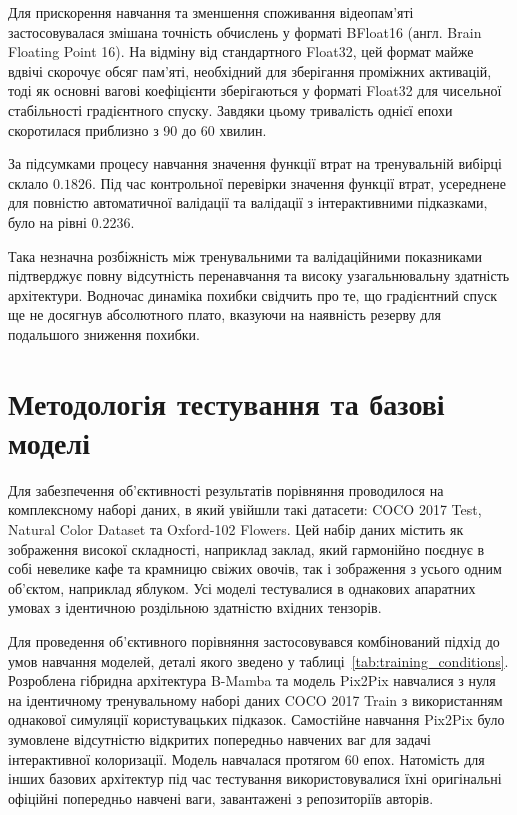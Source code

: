         Для прискорення навчання та зменшення споживання відеопам'яті застосовувалася змішана точність обчислень у форматі BFloat16 (англ. Brain Floating Point 16).
        На відміну від стандартного Float32, цей формат майже вдвічі скорочує обсяг пам'яті, необхідний для зберігання проміжних активацій, тоді як основні вагові коефіцієнти зберігаються у форматі Float32 для чисельної стабільності градієнтного спуску. Завдяки цьому тривалість однієї епохи скоротилася приблизно з 90 до 60 хвилин.

        За підсумками процесу навчання значення функції втрат на тренувальній вибірці склало $0.1826$.
        Під час контрольної перевірки значення функції втрат, усереднене для повністю автоматичної валідації та валідації з інтерактивними підказками, було на рівні $0.2236$.

        Така незначна розбіжність між тренувальними та валідаційними показниками підтверджує повну відсутність перенавчання та високу узагальнювальну здатність архітектури.
        Водночас динаміка похибки свідчить про те, що градієнтний спуск ще не досягнув абсолютного плато, вказуючи на наявність резерву для подальшого зниження похибки.

    \section{Методологія тестування та базові моделі}

        Для забезпечення об'єктивності результатів порівняння проводилося на комплексному наборі даних,
        в який увійшли такі датасети: COCO 2017 Test, Natural Color Dataset та Oxford-102 Flowers.
        Цей набір даних містить як зображення високої складності, наприклад заклад, який гармонійно поєднує в собі невелике кафе та крамницю свіжих овочів,
        так і зображення з усього одним об'єктом, наприклад яблуком.
        Усі моделі тестувалися в однакових апаратних умовах з ідентичною роздільною здатністю вхідних тензорів.

        Для проведення об'єктивного порівняння застосовувався комбінований підхід до умов навчання моделей, деталі якого зведено у таблиці~\ref{tab:training_conditions}. 
        Розроблена гібридна архітектура B-Mamba та модель Pix2Pix навчалися з нуля на ідентичному тренувальному наборі даних COCO 2017 Train з використанням однакової симуляції користувацьких підказок.
        Самостійне навчання Pix2Pix було зумовлене відсутністю відкритих попередньо навчених ваг для задачі інтерактивної колоризації. Модель навчалася протягом 60 епох.
        Натомість для інших базових архітектур під час тестування використовувалися їхні оригінальні офіційні попередньо навчені ваги, завантажені з репозиторіїв авторів.
        

